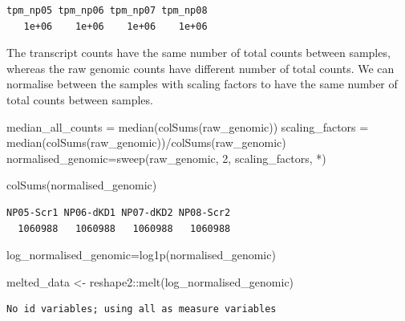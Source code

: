 \documentclass[
  letterpaper,
  DIV=11,
  numbers=noendperiod]{scrartcl}
\newenvironment{Shaded}{\begin{snugshade}}{\end{snugshade}}
\newcommand{\AttributeTok}[1]{\textcolor[rgb]{0.40,0.45,0.13}{#1}}
\newcommand{\DecValTok}[1]{\textcolor[rgb]{0.68,0.00,0.00}{#1}}
\newcommand{\FunctionTok}[1]{\textcolor[rgb]{0.28,0.35,0.67}{#1}}
\newcommand{\NormalTok}[1]{\textcolor[rgb]{0.00,0.23,0.31}{#1}}
\newcommand{\OtherTok}[1]{\textcolor[rgb]{0.00,0.23,0.31}{#1}}
\newcommand{\SpecialCharTok}[1]{\textcolor[rgb]{0.37,0.37,0.37}{#1}}
\newcommand{\StringTok}[1]{\textcolor[rgb]{0.13,0.47,0.30}{#1}}
\begin{document}
\begin{verbatim}
tpm_np05 tpm_np06 tpm_np07 tpm_np08 
   1e+06    1e+06    1e+06    1e+06 
\end{verbatim}

The transcript counts have the same number of total counts between
samples, whereas the raw genomic counts have different number of total
counts. We can normalise between the samples with scaling factors to
have the same number of total counts between samples.

\begin{Shaded}
\begin{Highlighting}[]
\NormalTok{median\_all\_counts }\OtherTok{=} \FunctionTok{median}\NormalTok{(}\FunctionTok{colSums}\NormalTok{(raw\_genomic))}
\NormalTok{scaling\_factors }\OtherTok{=} \FunctionTok{median}\NormalTok{(}\FunctionTok{colSums}\NormalTok{(raw\_genomic))}\SpecialCharTok{/}\FunctionTok{colSums}\NormalTok{(raw\_genomic)}
\NormalTok{normalised\_genomic}\OtherTok{=}\FunctionTok{sweep}\NormalTok{(raw\_genomic, }\DecValTok{2}\NormalTok{, scaling\_factors, }\StringTok{\textasciigrave{}}\AttributeTok{*}\StringTok{\textasciigrave{}}\NormalTok{)}

\FunctionTok{colSums}\NormalTok{(normalised\_genomic)}
\end{Highlighting}
\end{Shaded}

\begin{verbatim}
NP05-Scr1 NP06-dKD1 NP07-dKD2 NP08-Scr2 
  1060988   1060988   1060988   1060988 
\end{verbatim}

\begin{Shaded}
\begin{Highlighting}[]
\NormalTok{log\_normalised\_genomic}\OtherTok{=}\FunctionTok{log1p}\NormalTok{(normalised\_genomic)}

\NormalTok{melted\_data }\OtherTok{\textless{}{-}}\NormalTok{ reshape2}\SpecialCharTok{::}\FunctionTok{melt}\NormalTok{(log\_normalised\_genomic)}
\end{Highlighting}
\end{Shaded}

\begin{verbatim}
No id variables; using all as measure variables
\end{verbatim}
\end{document}
